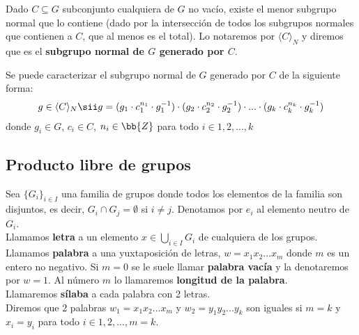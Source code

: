 \begin{definicion}
    Dado $C\subseteq G$ subconjunto cualquiera de $G$ no vacío, existe el menor subgrupo normal que lo contiene (dado por la intersección de todos los subgrupos normales que contienen a $C$, que al menos es el total). Lo notaremos por $\langle C  \rangle_N$ y diremos que es el \textbf{subgrupo normal de $G$ generado por $C$}.
\end{definicion}

\begin{observacion}
    Se puede caracterizar el subgrupo normal de $G$ generado por $C$ de la siguiente forma:
    \begin{gather*}
        g\in \langle C  \rangle_N \sii g = (g_1 \cdot c_1^{n_1} \cdot g_1^{-1}) \cdot (g_2 \cdot c_2^{n_2} \cdot g_2^{-1}) \cdot ... \cdot (g_k \cdot c_k^{n_k} \cdot g_k^{-1})
    \end{gather*}
    donde $g_i\in G$, $c_i\in C$, $n_i\in \bb{Z}$ para todo $i\in 1, 2, ..., k$
\end{observacion}

\subsection{Producto libre de grupos}

\begin{definicion}
    Sea $\{G_i\}_{i\in I}$ una familia de grupos donde todos los elementos de la familia son disjuntos, es decir, $G_i\cap G_j = \emptyset$ si $i\neq j$. Denotamos por $e_i$ al elemento neutro de $G_i$.\\
    
    Llamamos \textbf{letra} a un elemento $x\in \bigcup\limits_{i\in I} G_i$ de cualquiera de los grupos. \\

    Llamamos \textbf{palabra} a una yuxtaposición de letras, $w = x_1 x_2... x_m$ donde $m$ es un entero no negativo. Si $m=0$ se le suele llamar \textbf{palabra vacía} y la denotaremos por $w=1$. Al número $m$ lo llamaremos \textbf{longitud de la palabra}.\\

    Llamaremos \textbf{sílaba} a cada palabra con 2 letras.\\

    Diremos que 2 palabras $w_1=x_1x_2...x_m$ y $w_2=y_1y_2...y_k$ son iguales si $m=k$ y $x_i=y_i$ para todo $i\in 1,2,...,m=k$.
\end{definicion}

